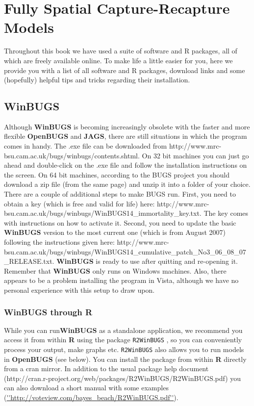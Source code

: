 \chapter{Fully Spatial Capture-Recapture Models}
\label{chapt.scr0}

\vspace{.3in}

Throughout this book we have used a suite of software and R packages, all of which are freely available online. To make life a little easier for you, here we provide you with a list of all software and R packages, download links and some (hopefully) helpful tips and tricks regarding their installation.  


\section{WinBUGS}
Although {\bf WinBUGS} \citep{gilks_etal:1994} is becoming increasingly obsolete with the faster and more flexible {\bf OpenBUGS} and {\bf JAGS}, there are still situations in which the program comes in handy.  
The .exe file can be downloaded from http://www.mrc-bsu.cam.ac.uk/bugs/winbugs/contents.shtml. On 32 bit machines you can just go ahead and double-click on the .exe file and follow the installation instructions on the screen.
On 64 bit machines, according to the BUGS project you should download a zip file (from the same page) and unzip it into a folder of your choice.
There are a couple of additional steps to make BUGS run. 
First, you need to obtain a key (which is free and valid for life) here: http://www.mrc-bsu.cam.ac.uk/bugs/winbugs/WinBUGS14_immortality_key.txt. The key comes with instructions on how to activate it.
Second, you need to update the basic {\bf WinBUGS} version to the most current one (which is from August 2007) following the instructions given here: http://www.mrc-bsu.cam.ac.uk/bugs/winbugs/WinBUGS14_cumulative_patch_No3_06_08_07_RELEASE.txt.
{\bf WinBUGS} is ready to use after quitting and re-opening it.
Remember that {\bf WinBUGS} only runs on Windows machines. Also, there appears to be a problem installing the program in Vista, although we have no personal experience with this setup to draw upon.

\subsection{WinBUGS through R}
While you can run{\bf WinBUGS} as a standalone application, we recommend you access it from within {\bf R} using the package {\tt R2WinBUGS} \citep{sturtz_etal:2005}, so you can conveniently process your output, make graphs etc.   {\tt R2WinBUGS} also allows you to run models in {\bf OpenBUGS} (see below). You can install the package from within {\bf R} directly from a cran mirror. In addition to the usual package help document (http://cran.r-project.org/web/packages/R2WinBUGS/R2WinBUGS.pdf) you can also download a short manual with some examples (\url{''http://voteview.com/bayes_beach/R2WinBUGS.pdf''}). 



